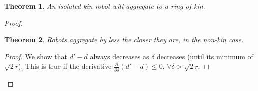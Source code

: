 \documentclass[conference]{IEEEtran}
\newtheorem{theorem}{Theorem}
\begin{document}
  \begin{theorem} \label{thm:aggregation_with_ring_of_kin}
    An isolated kin robot will aggregate to a ring of kin.
  \end{theorem}
  \begin{proof}

  \pagebreak


  \begin{theorem} \label{thm:decrease2}
    Robots aggregate by less the closer they are, in the non-kin case.
  \end{theorem}
  \begin{proof}

    We show that $d'-d$ always decreases as $\delta$ decreases (until its minimum of $\sqrt{2}r$). This is true if the derivative $\frac{\partial}{\partial\delta}(d'-d) \leq 0$, $\forall \delta>\sqrt{2}r$.


\end{proof}
\end{proof}
\end{document}
